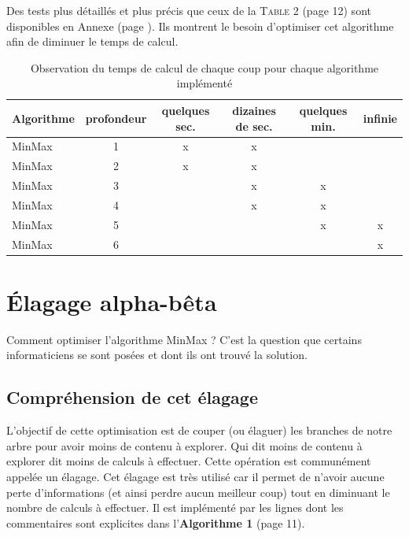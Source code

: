 \documentclass[11pt,a4paper]{article}
\begin{document}
\vspace{10px}

Des tests plus détaillés et plus précis que ceux de la \textsc{Table} 2 (page 12) sont disponibles en Annexe (page \pageref{fig:minMaxTempsExecution}). Ils montrent le besoin d'optimiser cet algorithme afin de diminuer le temps de calcul.

\newpage

\begin{table}[htbp]
    \centering
    \begin{tabular}{|l|c|c|c|c|c|}
        \hline
         Algorithme & profondeur & quelques sec. & dizaines de sec. & quelques min. & infinie \\
         \hline
         MinMax & 1 & x & x & &\\
         \hline
         MinMax & 2 & x & x & &\\
         \hline
         MinMax & 3 &  & x & x &\\
         \hline
         MinMax & 4 &  & x & x &\\
         \hline
         MinMax & 5 &  &  & x & x\\
         \hline
         MinMax & 6 &  &  &  & x\\
         \hline
    \end{tabular}
    \label{tab:tableauComparaisonTempsCalculCoup}
    \caption{Observation du temps de calcul de chaque coup pour chaque algorithme implémenté}
\end{table}

\section{Élagage alpha-bêta}

Comment optimiser l'algorithme MinMax ? C'est la question que certains informaticiens se sont posées et dont ils ont trouvé la solution.

\subsection{Compréhension de cet élagage}

L'objectif de cette optimisation est de couper (ou élaguer) les branches de notre arbre pour avoir moins de contenu à explorer. Qui dit moins de contenu à explorer dit moins de calculs à effectuer.
Cette opération est communément appelée un élagage. Cet élagage est très utilisé car il permet de n'avoir aucune perte d'informations (et ainsi perdre aucun meilleur coup) tout en diminuant le nombre de calculs à effectuer. Il est implémenté par les lignes dont les 
commentaires sont explicites dans l'\textbf{Algorithme 1} (page 11).
\end{document}

